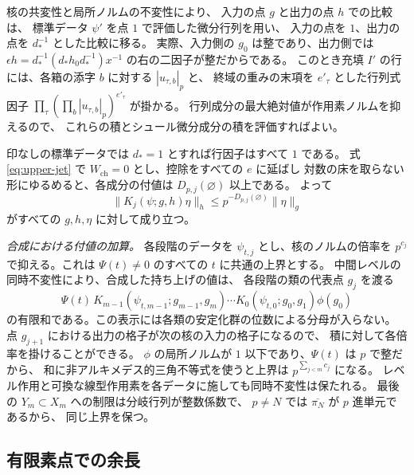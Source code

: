 核の共変性と局所ノルムの不変性により、
入力の点 \(g\) と出力の点 \(h\) での比較は、
標準データ \(\psi'\) を点 \(1\) で評価した微分行列を用い、
入力の点を \(1\)、出力の点を \(d_\ast^{-1}\) とした比較に移る。
実際、入力側の \(g_0\) は整であり、出力側では
\(\epsilon h=d_\ast^{-1}(d_\ast h_0d_\ast^{-1})x^{-1}\) の右の二因子が整だからである。
このとき充填 \(I'\) の行には、各箱の添字 \(b\) に対する \(|u_{\tau,b}|_p\) と、
終域の重みの末項を \(e'_\tau\) とした行列式因子
\(\prod_\tau(\prod_b|u_{\tau,b}|_p)^{e'_\tau}\) が掛かる。
行列成分の最大絶対値が作用素ノルムを抑えるので、
これらの積とシュール微分成分の積を評価すればよい。

印なしの標準データでは \(d_\ast=1\) とすれば行因子はすべて \(1\) である。
式 \eqref{eq:upper-jet} で \(W_\mathrm{ch}=0\) とし、控除をすべての \(e\) に延ばし
対数の床を取らない形にゆるめると、各成分の付値は \(D_{p,j}(\varnothing)\) 以上である。
よって
\begin{equation}\label{eq:upper-kernel-gauge}
 \|K_j(\psi;g,h)\eta\|_h
 \le p^{-D_{p,j}(\varnothing)}\|\eta\|_g
\end{equation}
がすべての \(g,h,\eta\) に対して成り立つ。

\emph{合成における付値の加算。}
各段階のデータを \(\psi_{t,j}\) とし、核のノルムの倍率を \(p^{c_j}\)
で抑える。これは \(\Psi(t)\ne0\) のすべての \(t\) に共通の上界とする。
中間レベルの同時不変性により、合成した持ち上げの値は、
各段階の類の代表点 \(g_j\) を渡る
\[
  \Psi(t)\,K_{m-1}(\psi_{t,m-1};g_{m-1},g_m)
        \cdots K_0(\psi_{t,0};g_0,g_1)\phi(g_0)
\]
の有限和である。この表示には各類の安定化群の位数による分母が入らない。
点 \(g_{j+1}\) における出力の格子が次の核の入力の格子になるので、
積に対して各倍率を掛けることができる。
\(\phi\) の局所ノルムが \(1\) 以下であり、\(\Psi(t)\) は \(p\) で整だから、
和に非アルキメデス的三角不等式を使うと上界は \(p^{\sum_{j<m}c_j}\) になる。
レベル作用と可換な線型作用素を各データに施しても同時不変性は保たれる。
最後の \(Y_m\subset X_m\) への制限は分岐行列が整数係数で、
\(p\ne N\) では \(\overline{\pi_N}\) が \(p\) 進単元であるから、
同じ上界を保つ。

\subsection{有限素点での余長}

